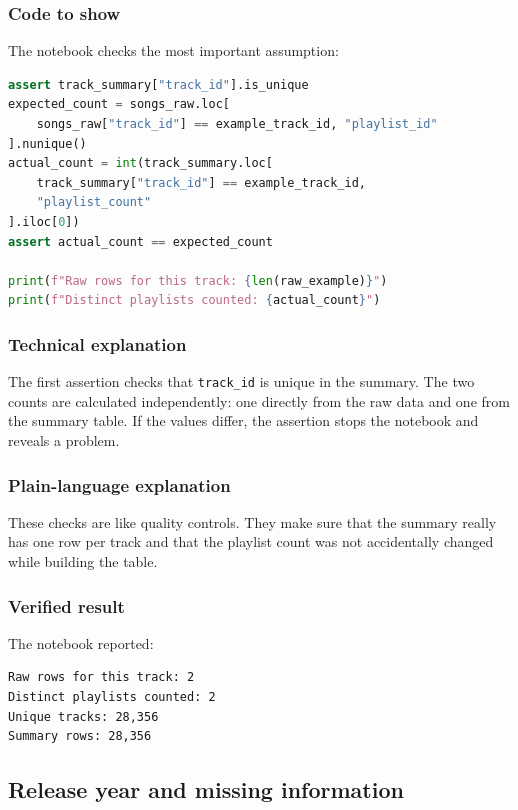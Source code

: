 \documentclass[11pt,a4paper]{article}
\begin{document}
\subsubsection*{Code to show}
The notebook checks the most important assumption:

\begin{lstlisting}[language=Python]
assert track_summary["track_id"].is_unique
expected_count = songs_raw.loc[
    songs_raw["track_id"] == example_track_id, "playlist_id"
].nunique()
actual_count = int(track_summary.loc[
    track_summary["track_id"] == example_track_id,
    "playlist_count"
].iloc[0])
assert actual_count == expected_count

print(f"Raw rows for this track: {len(raw_example)}")
print(f"Distinct playlists counted: {actual_count}")
\end{lstlisting}

\subsubsection*{Technical explanation}
The first assertion checks that \texttt{track\_id} is unique in the summary. The two counts are calculated independently: one directly from the raw data and one from the summary table. If the values differ, the assertion stops the notebook and reveals a problem.

\subsubsection*{Plain-language explanation}
These checks are like quality controls. They make sure that the summary really has one row per track and that the playlist count was not accidentally changed while building the table.

\subsubsection*{Verified result}
The notebook reported:

\begin{lstlisting}
Raw rows for this track: 2
Distinct playlists counted: 2
Unique tracks: 28,356
Summary rows: 28,356
\end{lstlisting}

\subsection{Release year and missing information}
\end{document}
